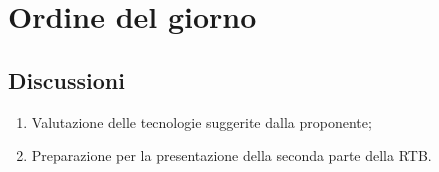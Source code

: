 \section{Ordine del giorno} \label{sec:agenda}
\subsection{Discussioni} \label{subsec:discussione}
\begin{enumerate}
    \item Valutazione delle tecnologie suggerite dalla proponente;
    \item Preparazione per la presentazione della seconda parte della RTB.

    
\end{enumerate}


